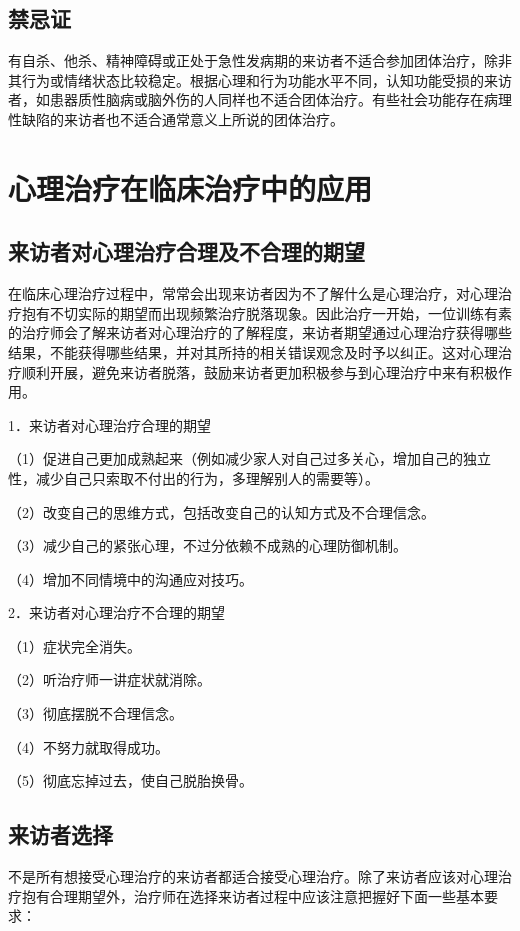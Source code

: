 \subsection{禁忌证}

有自杀、他杀、精神障碍或正处于急性发病期的来访者不适合参加团体治疗，除非其行为或情绪状态比较稳定。根据心理和行为功能水平不同，认知功能受损的来访者，如患器质性脑病或脑外伤的人同样也不适合团体治疗。有些社会功能存在病理性缺陷的来访者也不适合通常意义上所说的团体治疗。

\section{心理治疗在临床治疗中的应用}

\subsection{来访者对心理治疗合理及不合理的期望}

在临床心理治疗过程中，常常会出现来访者因为不了解什么是心理治疗，对心理治疗抱有不切实际的期望而出现频繁治疗脱落现象。因此治疗一开始，一位训练有素的治疗师会了解来访者对心理治疗的了解程度，来访者期望通过心理治疗获得哪些结果，不能获得哪些结果，并对其所持的相关错误观念及时予以纠正。这对心理治疗顺利开展，避免来访者脱落，鼓励来访者更加积极参与到心理治疗中来有积极作用。

1．来访者对心理治疗合理的期望

（1）促进自己更加成熟起来（例如减少家人对自己过多关心，增加自己的独立性，减少自己只索取不付出的行为，多理解别人的需要等）。

（2）改变自己的思维方式，包括改变自己的认知方式及不合理信念。

（3）减少自己的紧张心理，不过分依赖不成熟的心理防御机制。

（4）增加不同情境中的沟通应对技巧。

2．来访者对心理治疗不合理的期望

（1）症状完全消失。

（2）听治疗师一讲症状就消除。

（3）彻底摆脱不合理信念。

（4）不努力就取得成功。

（5）彻底忘掉过去，使自己脱胎换骨。

\subsection{来访者选择}

不是所有想接受心理治疗的来访者都适合接受心理治疗。除了来访者应该对心理治疗抱有合理期望外，治疗师在选择来访者过程中应该注意把握好下面一些基本要求：

